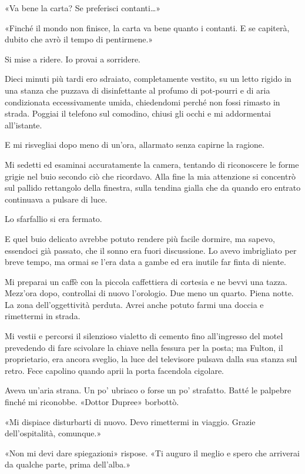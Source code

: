 «Va bene la carta? Se preferisci contanti\ldots»

«Finché il mondo non finisce, la carta va bene quanto i contanti. E se
capiterà, dubito che avrò il tempo di pentirmene.»

Si mise a ridere. Io provai a sorridere.

Dieci minuti più tardi ero sdraiato, completamente vestito, su un letto
rigido in una stanza che puzzava di disinfettante al profumo di
pot-pourri e di aria condizionata eccessivamente umida, chiedendomi
perché non fossi rimasto in strada. Poggiai il telefono sul comodino,
chiusi gli occhi e mi addormentai all'istante.

\separatorefiori

E mi risvegliai dopo meno di un'ora, allarmato senza capirne la ragione.

Mi sedetti ed esaminai accuratamente la camera, tentando di riconoscere
le forme grigie nel buio secondo ciò che ricordavo. Alla fine la mia
attenzione si concentrò sul pallido rettangolo della finestra, sulla
tendina gialla che da quando ero entrato continuava a pulsare di luce.

Lo sfarfallio si era fermato.

E quel buio delicato avrebbe potuto rendere più facile dormire, ma
sapevo, essendoci già passato, che il sonno era fuori discussione. Lo
avevo imbrigliato per breve tempo, ma ormai se l'era data a gambe ed era
inutile far finta di niente.

Mi preparai un caffè con la piccola caffettiera di cortesia e ne bevvi
una tazza. Mezz'ora dopo, controllai di nuovo l'orologio. Due meno un
quarto. Piena notte. La zona dell'oggettività perduta. Avrei anche
potuto farmi una doccia e rimettermi in strada.

Mi vestii e percorsi il silenzioso vialetto di cemento fino all'ingresso
del motel prevedendo di fare scivolare la chiave nella fessura per la
posta; ma Fulton, il proprietario, era ancora sveglio, la luce del
televisore pulsava dalla sua stanza sul retro. Fece capolino quando
aprii la porta facendola cigolare.

Aveva un'aria strana. Un po' ubriaco o forse un po' strafatto. Batté le
palpebre finché mi riconobbe. «Dottor Dupree» borbottò.

«Mi dispiace disturbarti di nuovo. Devo rimettermi in viaggio. Grazie
dell'ospitalità, comunque.»

«Non mi devi dare spiegazioni» rispose. «Ti auguro il meglio e spero che
arriverai da qualche parte, prima dell'alba.»

